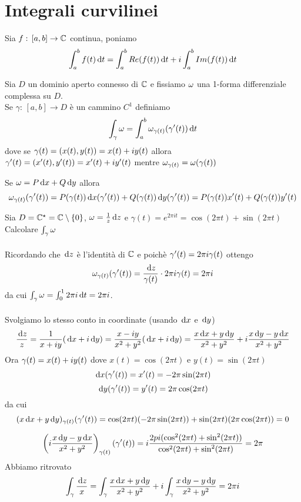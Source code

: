 \section{Integrali curvilinei}
\begin{defn}\bianco 
Sia $f:\, [a,b]\to \mathbb{C}$ continua, poniamo 
$$\int_a^b f(t) \, \mathrm{d}t = \int_a^b Re(f(t))\, \mathrm{d}t + i \int_a^b Im(f(t))\, \mathrm{d}t$$
\end{defn}
\begin{defn}Sia $D$ un dominio aperto connesso di $\mathbb{C}$ e fissiamo  $\omega$ una 1-forma differenziale complessa su $D$.\\
Se $\gamma:\, [a,b]\to D$ \`e un cammino $C^1$ definiamo 
$$\int_\gamma \omega = \int_a^b \omega_{\gamma(t)} (\gamma'(t))\, \mathrm{d}t$$
dove  se $\gamma(t)=(x(t),y(t))=x(t) + iy(t)$ allora $\gamma'(t) = (x'(t),y'(t))=x'(t) + iy'(t)$ mentre $\omega_{\gamma(t)} =\omega(\gamma(t))$ 
\end{defn}
\begin{oss}Se $\omega=P\, \mathrm{d} x + Q \, \mathrm{d} y $ allora 
$$\omega_{\gamma(t)}(\gamma'(t)) = P(\gamma(t))\, \mathrm{d} x (\gamma'(t))+ Q(\gamma(t))\, \mathrm{d} y (\gamma'(t))=P(\gamma(t))x'(t) + Q(\gamma(t))y'(t)$$
\end{oss}
\spazio 
\begin{ese}Sia $D=\mathbb{C}^\star = \mathbb{C} \setminus\{ 0 \}$,  $\omega = \frac{1}{z}\, \mathrm{d} z $ e $\gamma(t) =e^{2\pi i t } = \cos (2\pi t) + \sin (2\pi t)$\\
Calcolare $\int_\gamma \omega$\\ \\
Ricordando che $\, \mathrm{d} z $ \`e l'identit\`a di $\mathbb{C}$ e poich\`e $\gamma'(t) = 2\pi i \gamma(t)$ ottengo 
$$\omega_{\gamma(t)}(\gamma'(t)) = \frac{\, \mathrm{d} z}{\gamma(t) }\cdot 2\pi i\gamma(t) = 2\pi i $$
da cui $\int_\gamma \omega=\int_{0}^1 2\pi i \, \mathrm{d}t = 2\pi i $.\\ \\
Svolgiamo lo stesso conto in coordinate (usando $\, \mathrm{d} x $ e $\, \mathrm{d} y$)
$$\frac{\, \mathrm{d} z}{z}= \frac{1}{x+iy }(\, \mathrm{d} x + i \, \mathrm{d} y ) = \frac{x-iy}{x^2+y^2}(\, \mathrm{d} x + i \, \mathrm{d} y) = \frac{x\, \mathrm{d} x + y\, \mathrm{d} y }{x^2+y^2} +i \frac{x\, \mathrm{d} y -  y \, \mathrm{d} x }{x^2+y^2}$$
Ora $\gamma(t) = x(t) + i y(t)$ dove $x(t) = \cos (2\pi t) $ e $y(t) =\sin (2\pi t)$
$$\, \mathrm{d} x( \gamma'(t))=x'(t) =-2\pi \sin(2\pi t)$$
$$\, \mathrm{d} y( \gamma'(t))=y'(t) =2\pi \cos(2\pi t)$$
da cui 
$$(x\, \mathrm{d} x + y \, \mathrm{d} y)_{\gamma(t)}(\gamma'(t)) = \cos (2\pi t ) (-2\pi \sin (2\pi t))+\sin(2\pi t ) (2\pi \cos(2\pi t))=0$$

$$\left( i\frac{x\, \mathrm{d} y - y \, \mathrm{d} x}{x^2+y^2} \right)_{\gamma(t)}(\gamma'(t)) = i\frac{2pi (\cos^2 (2\pi t) + \sin^2(2\pi t))}{\cos^2 (2\pi t) + \sin^2(2\pi t)}=2\pi$$
Abbiamo ritrovato 
$$\int_\gamma \frac{\, \mathrm{d} z }{x} =\int_\gamma \frac{x\, \mathrm{d} x + y \, \mathrm{d} y}{x^2+y^2}+i \int_\gamma \frac{x\, \mathrm{d} y - y \, \mathrm{d} y}{x^2 + y^2}=2\pi i $$

\end{ese}

